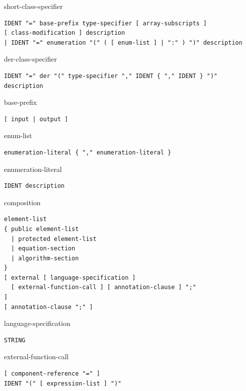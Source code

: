 \begin{production}{short-class-specifier}
\begin{lstlisting}
IDENT "=" base-prefix type-specifier [ array-subscripts ]
[ class-modification ] description
| IDENT "=" enumeration "(" ( [ enum-list ] | ":" ) ")" description
\end{lstlisting}
\end{production}

\begin{production}{der-class-specifier}
\begin{lstlisting}
IDENT "=" der "(" type-specifier "," IDENT { "," IDENT } ")" description
\end{lstlisting}
\end{production}

\begin{production}{base-prefix}
\begin{lstlisting}
[ input | output ]
\end{lstlisting}
\end{production}

\begin{production}{enum-list}
\begin{lstlisting}
enumeration-literal { "," enumeration-literal }
\end{lstlisting}
\end{production}

\begin{production}{enumeration-literal}
\begin{lstlisting}
IDENT description
\end{lstlisting}
\end{production}

\begin{production}{composition}
\begin{lstlisting}
element-list
{ public element-list
  | protected element-list
  | equation-section
  | algorithm-section
}
[ external [ language-specification ]
  [ external-function-call ] [ annotation-clause ] ";"
]
[ annotation-clause ";" ]
\end{lstlisting}
\end{production}

\begin{production}{language-specification}
\begin{lstlisting}
STRING
\end{lstlisting}
\end{production}

\begin{production}{external-function-call}
\begin{lstlisting}
[ component-reference "=" ]
IDENT "(" [ expression-list ] ")"
\end{lstlisting}
\end{production}

